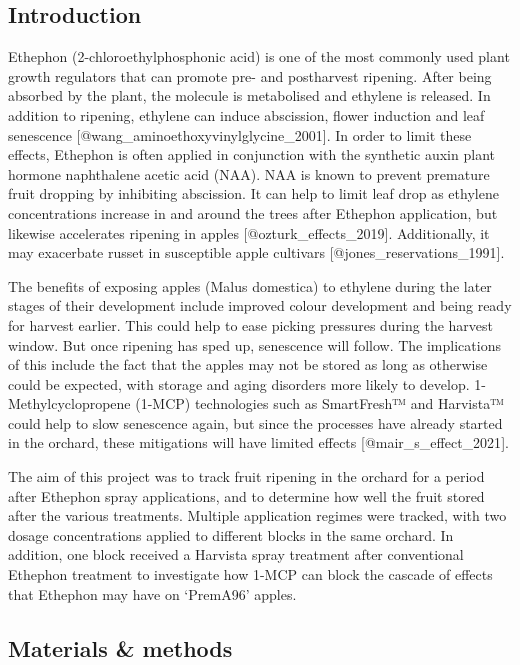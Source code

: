 \documentclass[
  letterpaper,
  DIV=11,
  numbers=noendperiod]{scrartcl}
\begin{document}
\hypertarget{introduction}{%
\subsection{Introduction}\label{introduction}}

Ethephon (2-chloroethylphosphonic acid) is one of the most commonly used
plant growth regulators that can promote pre- and postharvest ripening.
After being absorbed by the plant, the molecule is metabolised and
ethylene is released. In addition to ripening, ethylene can induce
abscission, flower induction and leaf senescence
{[}@wang\_aminoethoxyvinylglycine\_2001{]}. In order to limit these
effects, Ethephon is often applied in conjunction with the synthetic
auxin plant hormone naphthalene acetic acid (NAA). NAA is known to
prevent premature fruit dropping by inhibiting abscission. It can help
to limit leaf drop as ethylene concentrations increase in and around the
trees after Ethephon application, but likewise accelerates ripening in
apples {[}@ozturk\_effects\_2019{]}. Additionally, it may exacerbate
russet in susceptible apple cultivars {[}@jones\_reservations\_1991{]}.

The benefits of exposing apples (Malus domestica) to ethylene during the
later stages of their development include improved colour development
and being ready for harvest earlier. This could help to ease picking
pressures during the harvest window. But once ripening has sped up,
senescence will follow. The implications of this include the fact that
the apples may not be stored as long as otherwise could be expected,
with storage and aging disorders more likely to develop.
1-Methylcyclopropene (1-MCP) technologies such as SmartFresh™ and
Harvista™ could help to slow senescence again, but since the processes
have already started in the orchard, these mitigations will have limited
effects {[}@mair\_s\_effect\_2021{]}.

The aim of this project was to track fruit ripening in the orchard for a
period after Ethephon spray applications, and to determine how well the
fruit stored after the various treatments. Multiple application regimes
were tracked, with two dosage concentrations applied to different blocks
in the same orchard. In addition, one block received a Harvista spray
treatment after conventional Ethephon treatment to investigate how 1-MCP
can block the cascade of effects that Ethephon may have on `PremA96'
apples.

\hypertarget{materials-methods}{%
\subsection{Materials \& methods}\label{materials-methods}}
\end{document}
